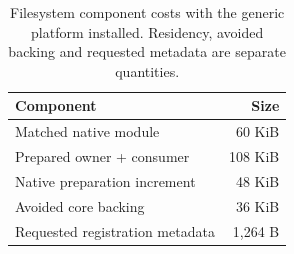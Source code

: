 \begin{table}[t]\centering\small
\caption{Filesystem component costs with the generic platform installed. Residency, avoided backing and requested metadata are separate quantities.}
\label{tab:filesystem-business}
\begin{tabular}{lr}\toprule Component & Size \\\midrule
Matched native module & 60 KiB \\
Prepared owner + consumer & 108 KiB \\
Native preparation increment & 48 KiB \\
Avoided core backing & 36 KiB \\
Requested registration metadata & 1,264 B \\
\bottomrule\end{tabular}\end{table}
